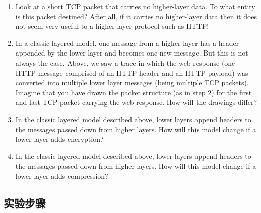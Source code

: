 \documentclass{article}
\begin{document}
	\begin{enumerate}[noitemsep]
		\item Look at a short TCP packet that carries no higher-layer data. To what entity is this packet destined? After all, if it carries no higher-layer data then it does not seem very useful to a higher layer protocol such as HTTP!
		\item In a classic layered model, one message from a higher layer has a header appended by the lower layer and becomes one new message. But this is not always the case. Above, we saw a trace in which the web response (one HTTP message comprised of an HTTP header and an HTTP payload) was converted into multiple lower layer messages (being multiple TCP packets).  Imagine that you have drawn the packet structure (as in step 2) for the first and last TCP packet carrying the web response.  How will the drawings differ?
		\item In the classic layered model described above, lower layers append headers to the messages passed down from higher layers. How will this model change if a lower layer adds encryption?
		\item In the classic layered model described above, lower layers append headers to the messages passed down from higher layers. How will this model change if a lower layer adds compression?
	\end{enumerate}
	
	
	\subsection{实验步骤}
	
\end{document}
